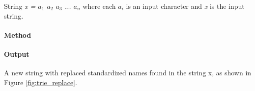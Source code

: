\noindent String \textit{x = $a_1$ $a_2$ $a_3$ ... $a_n$} where each \textit{$a_i$} is an input character and \textit{x} is the input string.

\paragraph*{Method}\hfill\break


\paragraph*{Output}
A new string with replaced standardized names found in the string x, as shown in Figure \ref{fig:trie_replace}.
